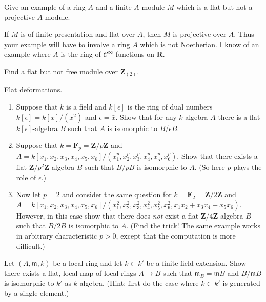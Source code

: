 \begin{exercise}
Give an example of a ring $A$ and a finite $A$-module $M$
which is a flat but not a projective $A$-module.
\end{exercise}

\begin{remark}
If $M$ is of finite presentation and flat over $A$,
then $M$ is projective over $A$. Thus your example will have to
involve a ring $A$ which is not Noetherian. I know of an example
where $A$ is the ring of ${\mathcal C}^\infty$-functions on ${\mathbf R}$.
\end{remark}

\begin{exercise}
Find a flat but not free module over ${\mathbf Z}_{(2)}$.
\end{exercise}

\begin{exercise}
Flat deformations. 
\begin{enumerate}
\item Suppose that $k$ is a field and $k[\epsilon]$ is the ring of 
dual numbers $k[\epsilon]=k[x]/(x^2)$ and $\epsilon = \bar x$. Show that for
any $k$-algebra $A$ there is a flat $k[\epsilon]$-algebra $B$ such that
$A$ is isomorphic to $B/\epsilon B$.
\item Suppose that $k={\mathbf F}_p = {\mathbf Z}/p{\mathbf Z}$ and 
$A = k[x_1,x_2,x_3,x_4,x_5,x_6]/(x_1^p,x_2^p,x_3^p,x_4^p,x_5^p,x_6^p)$.
Show that there exists a flat ${\mathbf Z}/p^2{\mathbf Z}$-algebra $B$ such
that $B/pB$ is isomorphic to $A$. (So here $p$ plays the role of $\epsilon$.)
\item Now let $p=2$ and consider the same question for
$k={\mathbf F}_2 = {\mathbf Z}/2{\mathbf Z}$ and 
$A = k[x_1,x_2,x_3,x_4,x_5,x_6]/(x_1^2,x_2^2,x_3^2,x_4^2,x_5^2,x_6^2,
x_1x_2+x_3x_4+x_5x_6)$. 
However, in this case show that there does {\it not} exist a flat
${\mathbf Z}/4{\mathbf Z}$-algebra $B$ such that $B/2B$ is isomorphic to
$A$. (Find the trick! The same example works in arbitrary characteristic
$p>0$, except that the computation is more difficult.)
\end{enumerate}
\end{exercise}

\begin{exercise}
Let $(A,{\mathfrak m},k)$ be a local ring and let $k \subset k'$ be
a finite field extension. Show there exists a flat, local map of
local rings $A \to B$ such that ${\mathfrak m}_B = {\mathfrak m} B$ and $B/{\mathfrak m} B$ is
isomorphic to $k'$ as $k$-algebra. (Hint: first do the case where
$k \subset k'$ is generated by a single element.)
\end{exercise}

